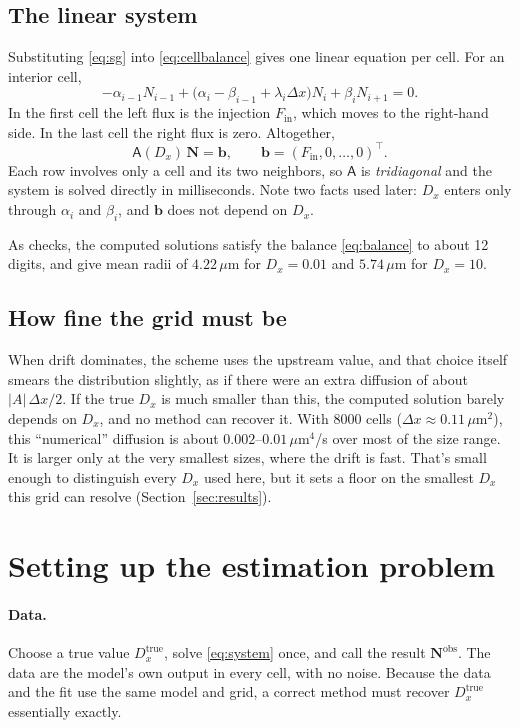 \documentclass[11pt]{article}
\newcommand{\um}{\,\mu\mathrm{m}}
\newcommand{\A}{\mathsf{A}}
\newcommand{\N}{\mathbf{N}}
\newcommand{\Fin}{F_{\mathrm{in}}}
\begin{document}
\subsection{The linear system}
Substituting \eqref{eq:sg} into \eqref{eq:cellbalance} gives one linear equation per cell. For an interior cell,
\[
-\alpha_{i-1}N_{i-1} + \bigl(\alpha_i - \beta_{i-1} + \lambda_i\Delta x\bigr)N_i + \beta_i N_{i+1} = 0 .
\]
In the first cell the left flux is the injection $\Fin$, which moves to the right-hand side. In the last cell the right flux is zero. Altogether,
\begin{equation}\label{eq:system}
\A(D_x)\,\N = \mathbf{b},\qquad \mathbf{b} = (\Fin, 0, \dots, 0)^{\top}.
\end{equation}
Each row involves only a cell and its two neighbors, so $\A$ is \emph{tridiagonal} and the system is solved directly in milliseconds. Note two facts used later: $D_x$ enters only through $\alpha_i$ and $\beta_i$, and $\mathbf{b}$ does not depend on $D_x$.

As checks, the computed solutions satisfy the balance \eqref{eq:balance} to about 12 digits, and give mean radii of $4.22\um$ for $D_x = 0.01$ and $5.74\um$ for $D_x = 10$.

\subsection{How fine the grid must be}
When drift dominates, the scheme uses the upstream value, and that choice itself smears the distribution slightly, as if there were an extra diffusion of about $|A|\,\Delta x/2$. If the true $D_x$ is much smaller than this, the computed solution barely depends on $D_x$, and no method can recover it. With 8000 cells ($\Delta x \approx 0.11\um^2$), this ``numerical'' diffusion is about $0.002$--$0.01\um^4$/s over most of the size range. It is larger only at the very smallest sizes, where the drift is fast. That's small enough to distinguish every $D_x$ used here, but it sets a floor on the smallest $D_x$ this grid can resolve (Section~\ref{sec:results}).

\section{Setting up the estimation problem}\label{sec:loss}
\paragraph{Data.} Choose a true value $D_x^{\mathrm{true}}$, solve \eqref{eq:system} once, and call the result $\N^{\mathrm{obs}}$. The data are the model's own output in every cell, with no noise. Because the data and the fit use the same model and grid, a correct method must recover $D_x^{\mathrm{true}}$ essentially exactly.
\end{document}
